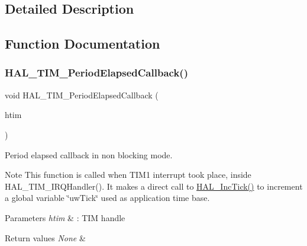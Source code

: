 \subsection{Detailed Description}


\subsection{Function Documentation}
\mbox{\label{group___t_i_m___exported___functions___group9_ga8a3b0ad512a6e6c6157440b68d395eac}} 
\subsubsection{\texorpdfstring{H\+A\+L\+\_\+\+T\+I\+M\+\_\+\+Period\+Elapsed\+Callback()}{HAL\_TIM\_PeriodElapsedCallback()}}
{\footnotesize\ttfamily void H\+A\+L\+\_\+\+T\+I\+M\+\_\+\+Period\+Elapsed\+Callback (\begin{DoxyParamCaption}\item[{\mbox{\hyperlink{struct_t_i_m___handle_type_def}{T\+I\+M\+\_\+\+Handle\+Type\+Def}} $\ast$}]{htim }\end{DoxyParamCaption})}



Period elapsed callback in non blocking mode. 

\begin{DoxyNote}{Note}
This function is called when T\+I\+M1 interrupt took place, inside H\+A\+L\+\_\+\+T\+I\+M\+\_\+\+I\+R\+Q\+Handler(). It makes a direct call to \mbox{\hyperlink{group___h_a_l___exported___functions___group2_gaba5b726bfedd013bf7bb5a51d5c4f188}{H\+A\+L\+\_\+\+Inc\+Tick()}} to increment a global variable \char`\"{}uw\+Tick\char`\"{} used as application time base. 
\end{DoxyNote}

\begin{DoxyParams}{Parameters}
{\em htim} & \+: T\+IM handle \\
\hline
\end{DoxyParams}

\begin{DoxyRetVals}{Return values}
{\em None} & \\
\hline
\end{DoxyRetVals}

